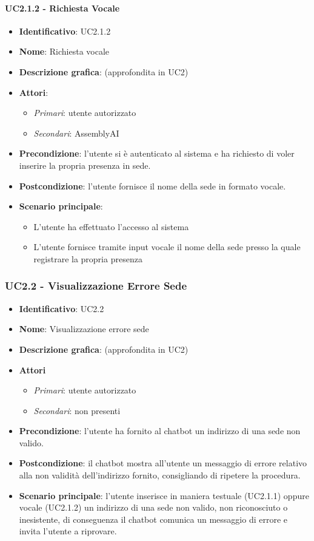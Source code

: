 \paragraph{UC2.1.2 - Richiesta Vocale}
\begin{itemize}
   \item \textbf{Identificativo}: UC2.1.2
   \item \textbf{Nome}: Richiesta vocale
   \item \textbf{Descrizione grafica}: (approfondita in UC2)
   \item \textbf{Attori}:
   \begin{itemize} 
       \item \textit{Primari}: utente autorizzato
       \item \textit{Secondari}: AssemblyAI
   \end{itemize}
       \item \textbf{Precondizione}: l'utente si è autenticato al sistema e ha richiesto di voler inserire la propria presenza in sede. 
       \item \textbf{Postcondizione}: l'utente fornisce il nome della sede in formato vocale. 
    \item \textbf{Scenario principale}: 
       \begin{itemize}
           \item L'utente ha effettuato l'accesso al sistema 
           \item L'utente fornisce tramite input vocale il nome della sede presso la quale registrare la propria presenza
       \end{itemize}
\end{itemize}

\subsubsection{UC2.2 - Visualizzazione Errore Sede}
\begin{itemize}
    \item \textbf{Identificativo}: UC2.2
    \item \textbf{Nome}: Visualizzazione errore sede
    \item \textbf{Descrizione grafica}: (approfondita in UC2)
    \item \textbf{Attori}
 \begin{itemize} 
    \item \textit{Primari}: utente autorizzato
    \item \textit{Secondari}: non presenti
 \end{itemize}
 \item \textbf{Precondizione}: l'utente ha fornito al chatbot un indirizzo di una sede non valido.
 \item \textbf{Postcondizione}: il chatbot mostra all'utente un messaggio di errore relativo alla non validità dell'indirizzo fornito, consigliando di ripetere la procedura. 
 \item \textbf{Scenario principale}: l'utente inserisce in maniera testuale (UC2.1.1) oppure vocale (UC2.1.2) un indirizzo di una sede non valido, non riconosciuto o inesistente, di conseguenza il chatbot comunica un messaggio di errore e invita l'utente a riprovare. 
\end{itemize}
\newpage